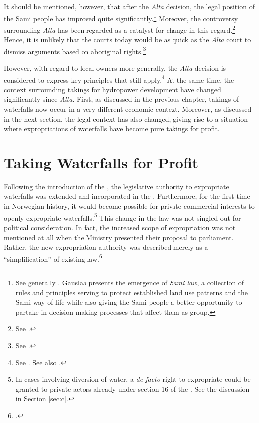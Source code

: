 It should be mentioned, however, that after the {\it Alta} decision, the legal position of the Sami people has improved quite significantly.\footnote{See generally \cite{gauslaa07}. Gauslaa presents the emergence of {\it Sami law}, a collection of rules and principles serving to protect established land use patterns and the Sami way of life while also giving the Sami people a better opportunity to partake in decision-making processes that affect them as group.} Moreover, the controversy surrounding {\it Alta} has been regarded as a catalyst for change in this regard.\footnote{See \cite[156]{ravna12s}.} Hence, it is unlikely that the courts today would be as quick as the {\it Alta} court to dismiss arguments based on aboriginal rights.\footnote{See \cite[180]{gauslaa07}.}

However, with regard to local owners more generally, the {\it Alta} decision is considered to express key principles that still apply.\footnote{See \cite{jorpeland11}. See also \cite[312]{haagensen02}.} 
At the same time, the context surrounding takings for hydropower development have changed significantly since {\it Alta}. First, as discussed in the previous chapter, takings of waterfalls now occur in a very different economic context. Moreover, as discussed in the next section, the legal context has also changed, giving rise to a situation where expropriations of waterfalls have become pure takings for profit.

\section{Taking Waterfalls for Profit}\label{sec:5:5}

Following the introduction of the \cite{wra00}, the legislative authority to expropriate waterfalls  was extended and incorporated in the \cite{ea59}. Furthermore, for the first time in Norwegian history, it would become possible for private commercial interests to openly expropriate waterfalls.\footnote{In cases involving diversion of water, a {\it de facto} right to expropriate could be granted to private actors already under section 16 of the \cite{wra17}. See the discussion in Section \ref{sec:c}.} This change in the law was not singled out for political consideration. In fact, the increased scope of expropriation was not mentioned at all when the Ministry presented their proposal to parliament. Rather, the new expropriation authority was described merely as a ``simplification'' of existing law.\footcite[223-225]{otprp39}

